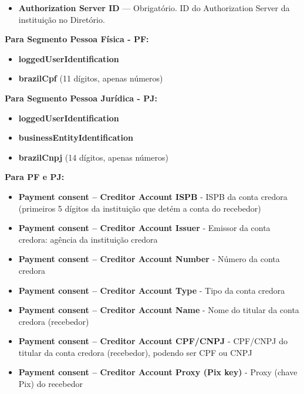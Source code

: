 \begin{itemize}
    \item \textbf{Authorization Server ID} — Obrigatório. ID do Authorization Server da instituição no Diretório.
\end{itemize}

\textbf{Para Segmento Pessoa Física - PF:}
\begin{itemize}
    \item \textbf{\textcolor{red!80}{loggedUserIdentification}}
    \item \textbf{\textcolor{red!80}{brazilCpf}} (11 dígitos, apenas números)
\end{itemize}

\textbf{Para Segmento Pessoa Jurídica - PJ:}
\begin{itemize}
    \item \textbf{\textcolor{red!80}{loggedUserIdentification}}
    \item \textbf{\textcolor{red!80}{businessEntityIdentification}}
    \item \textbf{\textcolor{red!80}{brazilCnpj}} (14 dígitos, apenas números)
\end{itemize}

\textbf{Para PF e PJ:}

\begin{itemize}
    \item \textbf{\textcolor{red!80}{Payment consent – Creditor Account ISPB}} - ISPB da conta credora (primeiros 5 dígitos da instituição que detém a conta do recebedor)
    \item \textbf{\textcolor{red!80}{Payment consent – Creditor Account Issuer}} - Emissor da conta credora: agência da instituição credora
    \item \textbf{\textcolor{red!80}{Payment consent – Creditor Account Number}} - Número da conta credora
    \item \textbf{\textcolor{red!80}{Payment consent – Creditor Account Type}} - Tipo da conta credora
    \item \textbf{\textcolor{red!80}{Payment consent – Creditor Account Name}} - Nome do titular da conta credora (recebedor)
    \item \textbf{\textcolor{red!80}{Payment consent – Creditor Account CPF/CNPJ}} - CPF/CNPJ do titular da conta credora (recebedor), podendo ser CPF ou CNPJ
    \item \textbf{\textcolor{red!80}{Payment consent – Creditor Account Proxy (Pix key)}} - Proxy (chave Pix) do recebedor
\end{itemize}

